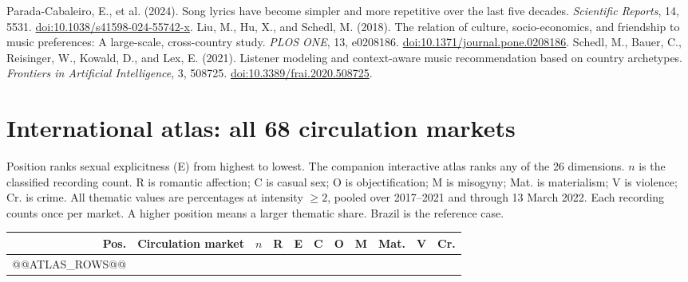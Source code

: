 \documentclass[10pt,a4paper,twocolumn]{article}
\begin{document}
\begin{thebibliography}{99}
 Parada-Cabaleiro, E., et al. (2024). Song lyrics have become simpler and more repetitive over the last five decades. \textit{Scientific Reports}, 14, 5531. \href{https://doi.org/10.1038/s41598-024-55742-x}{doi:10.1038/s41598-024-55742-x}.
 Liu, M., Hu, X., and Schedl, M. (2018). The relation of culture, socio-economics, and friendship to music preferences: A large-scale, cross-country study. \textit{PLOS ONE}, 13, e0208186. \href{https://doi.org/10.1371/journal.pone.0208186}{doi:10.1371/journal.pone.0208186}.
 Schedl, M., Bauer, C., Reisinger, W., Kowald, D., and Lex, E. (2021). Listener modeling and context-aware music recommendation based on country archetypes. \textit{Frontiers in Artificial Intelligence}, 3, 508725. \href{https://doi.org/10.3389/frai.2020.508725}{doi:10.3389/frai.2020.508725}.
\end{thebibliography}
\endgroup
\clearpage
\onecolumn
\section*{International atlas: all 68 circulation markets}
\small Position ranks sexual explicitness (E) from highest to lowest. The companion interactive atlas ranks any of the 26 dimensions. $n$ is the classified recording count. R is romantic affection; C is casual sex; O is objectification; M is misogyny; Mat. is materialism; V is violence; Cr. is crime. All thematic values are percentages at intensity $\geq2$, pooled over 2017--2021 and through 13 March 2022. Each recording counts once per market. A higher position means a larger thematic share. Brazil is the reference case.\par\vspace{4pt}
\centering
\fontsize{8}{9}\selectfont\setlength{\tabcolsep}{4pt}
\begin{tabular}{@{}rlrrrrrrrrr@{}}
\toprule Pos. & Circulation market & $n$ & R & E & C & O & M & Mat. & V & Cr. \\
\midrule
@@ATLAS_ROWS@@
\bottomrule
\end{tabular}
\end{document}
